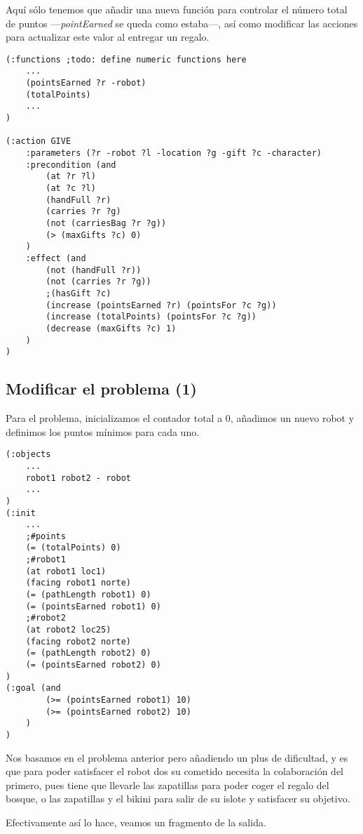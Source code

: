 \documentclass{article}
\newcommand{\img}[1]{
\noindent\makebox[0.9\textwidth][c]{\texttt{[image: \#1]}}%
}
\begin{document}
Aquí sólo tenemos que añadir una nueva función para controlar el número total de puntos ---\emph{pointEarned} se queda como estaba---, así como modificar las acciones para actualizar este valor al entregar un regalo.

\begin{lstlisting}
(:functions ;todo: define numeric functions here
    ...
    (pointsEarned ?r -robot)
    (totalPoints)
    ...
)

(:action GIVE
    :parameters (?r -robot ?l -location ?g -gift ?c -character)
    :precondition (and 
        (at ?r ?l)
        (at ?c ?l)
        (handFull ?r)
        (carries ?r ?g)
        (not (carriesBag ?r ?g))
        (> (maxGifts ?c) 0)
    )
    :effect (and 
        (not (handFull ?r))
        (not (carries ?r ?g))
        ;(hasGift ?c)
        (increase (pointsEarned ?r) (pointsFor ?c ?g))
        (increase (totalPoints) (pointsFor ?c ?g))
        (decrease (maxGifts ?c) 1)
    )
)
\end{lstlisting}

\subsection{Modificar el problema (1)}

Para el problema, inicializamos el contador total a 0, añadimos un nuevo robot y definimos los puntos mínimos para cada uno.

\begin{lstlisting}
(:objects 
    ...
    robot1 robot2 - robot
    ...
)
(:init
	...
	;#points
    (= (totalPoints) 0)
    ;#robot1
    (at robot1 loc1)
    (facing robot1 norte)
    (= (pathLength robot1) 0)
    (= (pointsEarned robot1) 0)
    ;#robot2
    (at robot2 loc25)
    (facing robot2 norte)
    (= (pathLength robot2) 0)
    (= (pointsEarned robot2) 0)
)
(:goal (and
        (>= (pointsEarned robot1) 10)
        (>= (pointsEarned robot2) 10)
    )
)
\end{lstlisting}

Nos basamos en el problema anterior pero añadiendo un plus de dificultad, y es que para poder satisfacer el robot dos su cometido necesita la colaboración del primero, pues tiene que llevarle las zapatillas para poder coger el regalo del bosque, o las zapatillas y el bikini para salir de su islote y satisfacer su objetivo.

\img{img/map6}

Efectivamente así lo hace, veamos un fragmento de la salida.
\end{document}
